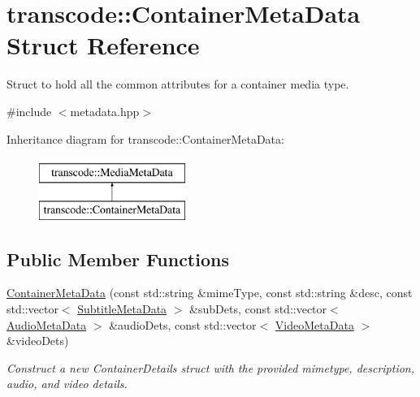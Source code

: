 \hypertarget{structtranscode_1_1ContainerMetaData}{
\section{transcode::ContainerMetaData Struct Reference}
\label{structtranscode_1_1ContainerMetaData}
}


Struct to hold all the common attributes for a container media type.  




{\ttfamily \#include $<$metadata.hpp$>$}

Inheritance diagram for transcode::ContainerMetaData:\begin{figure}[H]
\begin{center}
\leavevmode
\includegraphics[height=2.000000cm]{structtranscode_1_1ContainerMetaData}
\end{center}
\end{figure}
\subsection*{Public Member Functions}
\begin{DoxyCompactItemize}
\item 
\hyperlink{structtranscode_1_1ContainerMetaData_aaecda8bf6a1ebdaaff17275967b5fb40}{ContainerMetaData} (const std::string \&mimeType, const std::string \&desc, const std::vector$<$ \hyperlink{structtranscode_1_1SubtitleMetaData}{SubtitleMetaData} $>$ \&subDets, const std::vector$<$ \hyperlink{structtranscode_1_1AudioMetaData}{AudioMetaData} $>$ \&audioDets, const std::vector$<$ \hyperlink{structtranscode_1_1VideoMetaData}{VideoMetaData} $>$ \&videoDets)
\begin{DoxyCompactList}\small\item\em Construct a new ContainerDetails struct with the provided mimetype, description, audio, and video details. \item\end{DoxyCompactList}\end{DoxyCompactItemize}
